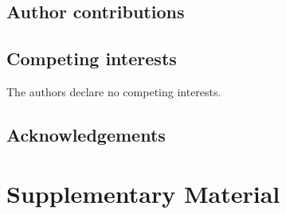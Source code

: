 \documentclass[sn-nature]{sn-jnl}
\begin{document}
\subsection*{Author contributions}

\subsection*{Competing interests}
The authors declare no competing interests.

\subsection*{Acknowledgements}



\clearpage
\appendix
\section*{Supplementary Material}

\renewcommand{\thefigure}{S\arabic{figure}}
\setcounter{figure}{0}


\end{document}

